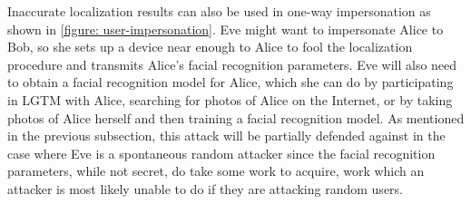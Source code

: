 \documentclass[12pt]{report}
\begin{document}
Inaccurate localization results can also be used in one-way impersonation as shown in \ref{figure: user-impersonation}. Eve might want to impersonate Alice to Bob, so she sets up a device near enough to Alice to fool the localization procedure and transmits Alice's facial recognition parameters. Eve will also need to obtain a facial recognition model for Alice, which she can do by participating in LGTM with Alice, searching for photos of Alice on the Internet, or by taking photos of Alice herself and then training a facial recognition model. As mentioned in the previous subsection, this attack will be partially defended against in the case where Eve is a spontaneous random attacker since the facial recognition parameters, while not secret, do take some work to acquire, work which an attacker is most likely unable to do if they are attacking random users. \par
\end{document}

